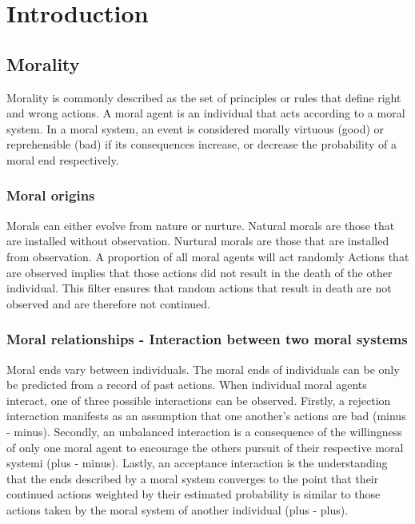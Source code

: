 \chapter{Introduction}
\section{Morality}
Morality is commonly described as the set of principles or rules that define right and wrong actions.
A moral agent is an individual that acts according to a moral system.
In a moral system, an event is considered morally virtuous (good) or reprehensible (bad) if its consequences increase, or decrease the probability of a moral end respectively.

\subsection{Moral origins}
Morals can either evolve from nature or nurture.
Natural morals are those that are installed without observation.
Nurtural morals are those that are installed from observation.
A proportion of all moral agents will act randomly
Actions that are observed implies that those actions did not result in the death of the other individual.
This filter ensures that random actions that result in death are not observed and are therefore not continued.

\subsection{Moral relationships - Interaction between two moral systems}
Moral ends vary between individuals.
The moral ends of individuals can be only be predicted from a record of past actions.
When individual moral agents interact, one of three possible interactions can be observed.
Firstly, a rejection interaction manifests as an assumption that one another's actions are bad (minus - minus). 
Secondly, an unbalanced interaction is a consequence of the willingness of only one moral agent to encourage the others pursuit of their respective moral systemi (plus - minus).
Lastly, an acceptance interaction is the understanding that the ends described by a moral system converges to the point that their continued actions weighted by their estimated probability is similar to those actions taken by the moral system of another individual (plus - plus).

